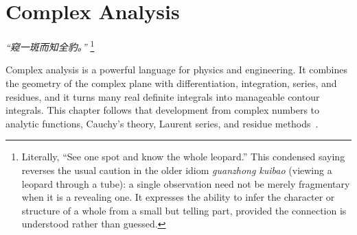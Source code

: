 \chapter{Complex Analysis}
\renewcommand{\currentchapterpath}{chapters/complex/}

\begin{flushright}
\textit{“窥一斑而知全豹。” }
\footnote{Literally, ``See one spot and know the whole leopard.'' 
This condensed saying reverses the usual caution in the older idiom 
\textit{guanzhong kuibao} (viewing a leopard through a tube): 
a single observation need not be merely fragmentary when it is a 
revealing one. It expresses the ability to infer the character or 
structure of a whole from a small but telling part, provided the 
connection is understood rather than guessed.}
\end{flushright}


Complex analysis is a powerful language for physics and engineering. It combines the geometry of the complex plane with differentiation, integration, series, and residues, and it turns many real definite integrals into manageable contour integrals. This chapter follows that development from complex numbers to analytic functions, Cauchy's theory, Laurent series, and residue methods~\cite{churchill,ahlfors,needham}.

